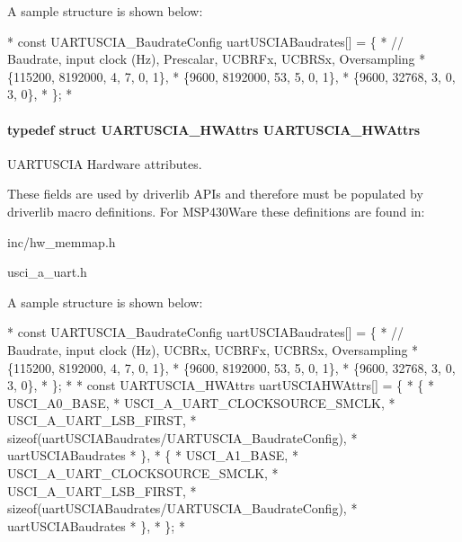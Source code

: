 A sample structure is shown below\-: 
\begin{DoxyCode}
*  \textcolor{keyword}{const} UARTUSCIA_BaudrateConfig uartUSCIABaudrates[] = \{
*   \textcolor{comment}{// Baudrate, input clock (Hz), Prescalar, UCBRFx, UCBRSx, Oversampling}
*      \{115200,  8192000,          4,         7,      0,      1\},
*      \{9600,    8192000,          53,        5,      0,      1\},
*      \{9600,    32768,            3,         0,      3,      0\},
*  \};
*  
\end{DoxyCode}
\paragraph[{U\-A\-R\-T\-U\-S\-C\-I\-A\-\_\-\-H\-W\-Attrs}]{\setlength{\rightskip}{0pt plus 5cm}typedef struct {\bf U\-A\-R\-T\-U\-S\-C\-I\-A\-\_\-\-H\-W\-Attrs}  {\bf U\-A\-R\-T\-U\-S\-C\-I\-A\-\_\-\-H\-W\-Attrs}}\label{_u_a_r_t_u_s_c_i_a_8h_ae0df79ea0be8c2a982879d4ca96640b6}


U\-A\-R\-T\-U\-S\-C\-I\-A Hardware attributes. 

These fields are used by driverlib A\-P\-Is and therefore must be populated by driverlib macro definitions. For M\-S\-P430\-Ware these definitions are found in\-:
\begin{DoxyItemize}
\item inc/hw\-\_\-memmap.\-h
\item usci\-\_\-a\-\_\-uart.\-h
\end{DoxyItemize}

A sample structure is shown below\-: 
\begin{DoxyCode}
*  \textcolor{keyword}{const} UARTUSCIA_BaudrateConfig uartUSCIABaudrates[] = \{
*   \textcolor{comment}{// Baudrate, input clock (Hz), UCBRx, UCBRFx, UCBRSx, Oversampling}
*      \{115200,  8192000,          4,     7,      0,      1\},
*      \{9600,    8192000,          53,    5,      0,      1\},
*      \{9600,    32768,            3,     0,      3,      0\},
*  \};
*
*  \textcolor{keyword}{const} UARTUSCIA_HWAttrs uartUSCIAHWAttrs[] = \{
*      \{
*          USCI\_A0\_BASE,
*          USCI\_A\_UART\_CLOCKSOURCE\_SMCLK,
*          USCI\_A\_UART\_LSB\_FIRST,
*          \textcolor{keyword}{sizeof}(uartUSCIABaudrates/UARTUSCIA_BaudrateConfig),
*          uartUSCIABaudrates
*      \},
*      \{
*          USCI\_A1\_BASE,
*          USCI\_A\_UART\_CLOCKSOURCE\_SMCLK,
*          USCI\_A\_UART\_LSB\_FIRST,
*          \textcolor{keyword}{sizeof}(uartUSCIABaudrates/UARTUSCIA_BaudrateConfig),
*          uartUSCIABaudrates
*      \},
*  \};
*  
\end{DoxyCode}
